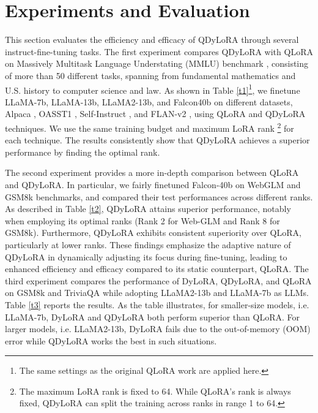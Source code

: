 \documentclass[11pt]{article}
\begin{document}
\section{Experiments and Evaluation}


This section evaluates the efficiency and efficacy of QDyLoRA through several instruct-fine-tuning tasks. The first experiment compares QDyLoRA with QLoRA on Massively Multitask Language Understating (MMLU) benchmark \cite{hendrycks2020measuring}, consisting of more than 50 different tasks, spanning from fundamental mathematics and U.S. history to computer science and law. As shown in Table \ref{t1}\footnote{The same settings as the original QLoRA work are applied here.}, we finetune LLaMA-7b, LLaMA-13b, LLaMA2-13b, and Falcon40b on different datasets, Alpaca \cite{taori2023stanford}, OASST1 \cite{kopf2023openassistant}, Self-Instruct \cite{wang2022self}, and FLAN-v2 \cite{chung2022scaling}, using QLoRA and QDyLoRA techniques. We use the same training budget and maximum LoRA rank \footnote{The maximum LoRA rank is fixed to 64. While QLoRA's rank is always fixed, QDyLoRA can split the training across ranks in range 1 to 64.} for each technique. The results consistently show that QDyLoRA achieves a superior performance by finding the optimal rank. 

The second experiment provides a more in-depth comparison between QLoRA and QDyLoRA. In particular, we fairly finetuned Falcon-40b on WebGLM \cite{liu2023webglm} and GSM8k \cite{cobbe2021training} benchmarks, and compared their test performances across different ranks. As described in Table \ref{t2}, QDyLoRA attains superior performance, notably when employing its optimal ranks (Rank 2 for Web-GLM and Rank 8 for GSM8k). Furthermore, QDyLoRA exhibits consistent superiority over QLoRA, particularly at lower ranks. These findings emphasize the adaptive nature of QDyLoRA in dynamically adjusting its focus during fine-tuning, leading to enhanced efficiency and efficacy compared to its static counterpart, QLoRA. The third experiment compares the performance of DyLoRA, QDyLoRA, and QLoRA on GSM8k and TriviaQA \cite{joshi2017triviaqa} while adopting LLaMA2-13b and LLaMA-7b as LLMs. Table \ref{t3} reports the results. As the table illustrates, for smaller-size models, i.e. LLaMA-7b, DyLoRA and QDyLoRA both perform superior than QLoRA. For larger models, i.e. LLaMA2-13b, DyLoRA fails due to the out-of-memory (OOM) error while QDyLoRA works the best in such situations.
\end{document}
